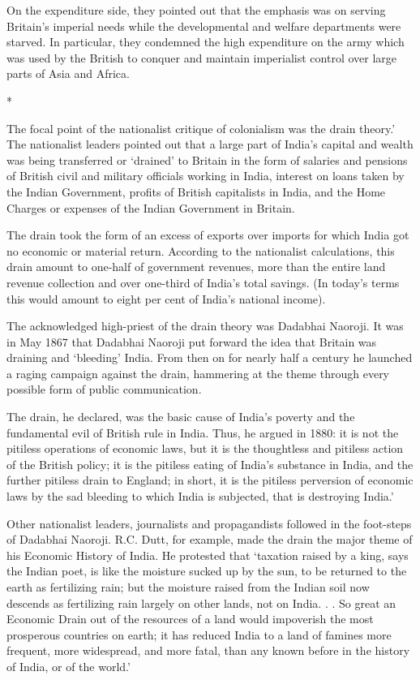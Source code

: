 On the expenditure side, they pointed out that the emphasis was on serving Britain’s imperial needs while the developmental and welfare departments were starved. In particular, they condemned the high expenditure on the army which was used by the British to conquer and maintain imperialist control over large parts of Asia and Africa.

\begin{center}*\end{center}



The focal point of the nationalist critique of colonialism was the drain theory.’ The nationalist leaders pointed out that a large part of India’s capital and wealth was being transferred or ‘drained’ to Britain in the form of salaries and pensions of British civil and military officials working in India, interest on loans taken by the Indian Government, profits of British capitalists in India, and the Home Charges or expenses of the Indian Government in Britain.

The drain took the form of an excess of exports over imports for which India got no economic or material return. According to the nationalist calculations, this drain amount to one-half of government revenues, more than the entire land revenue collection and over one-third of India’s total savings. (In today’s terms this would amount to eight per cent of India’s national income).

The acknowledged high-priest of the drain theory was Dadabhai Naoroji. It was in May 1867 that Dadabhai Naoroji put forward the idea that Britain was draining and ‘bleeding’ India. From then on for nearly half a century he launched a raging campaign against the drain, hammering at the theme through every possible form of public communication.

The drain, he declared, was the basic cause of India’s poverty and the fundamental evil of British rule in India. Thus, he argued in 1880: it is not the pitiless operations of economic laws, but it is the thoughtless and pitiless action of the British policy; it is the pitiless eating of India’s substance in India, and the further pitiless drain to England; in short, it is the pitiless perversion of economic laws by the sad bleeding to which India is subjected, that is destroying India.’

Other nationalist leaders, journalists and propagandists followed in the foot-steps of Dadabhai Naoroji. R.C. Dutt, for example, made the drain the major theme of his Economic History of India. He protested that ‘taxation raised by a king, says the Indian poet, is like the moisture sucked up by the sun, to be returned to the earth as fertilizing rain; but the moisture raised from the Indian soil now descends as fertilizing rain largely on other lands, not on India. . . So great an Economic Drain out of the resources of a land would impoverish the most prosperous countries on earth; it has reduced India to a land of famines more frequent, more widespread, and more fatal, than any known before in the history of India, or of the world.’

